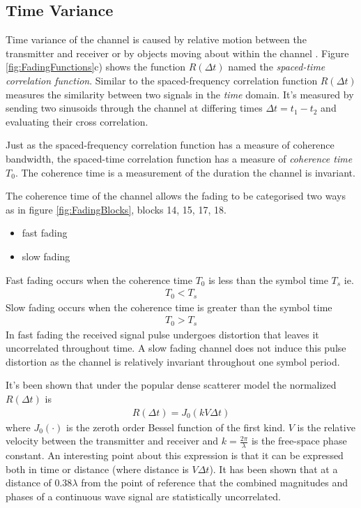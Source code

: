 \subsection{Time Variance}
Time variance of the channel is caused by relative %
motion between the transmitter and receiver or by %
objects moving about within the channel \cite{Sklar01}. %
Figure \ref{fig:FadingFunctions}c) shows the function %
$R(\Delta t)$ named the \emph{spaced-time correlation %
function}. Similar to the spaced-frequency correlation %
function $R(\Delta t)$ measures the similarity between %
two signals in the \emph{time} domain. It's measured %
by sending two sinusoids through the channel at differing %
times $\Delta t = t_{1} - t_{2}$ and evaluating their %
cross correlation. 

Just as the spaced-frequency correlation function has a %
measure of coherence bandwidth, the spaced-time %
correlation function has a measure of \emph{coherence %
time} $T_{0}$. The coherence time is a measurement of %
the duration the channel is invariant. 

The coherence time of the channel allows the fading %
to be categorised two ways as in figure \ref{fig:FadingBlocks}, %
blocks 14, 15, 17, 18.
\begin{itemize}
	\item{fast fading}
	\item{slow fading}
\end{itemize}
Fast fading occurs when the coherence time $T_{0}$ %
is less than the symbol time $T_{s}$ ie.
\begin{align}
	T_{0} < T_{s}
\end{align}
Slow fading occurs when the coherence time is %
greater than the symbol time
\begin{align}
	T_{0} > T_{s}
\end{align}
In fast fading the received signal pulse undergoes %
distortion that leaves it uncorrelated throughout time. %
A slow fading channel does not induce this pulse distortion %
as the channel is relatively invariant throughout one symbol %
period.

It's been shown \cite{Clarke68} that under the popular %
dense scatterer model the normalized $R(\Delta t)$ is
\begin{align}
	R(\Delta t) = J_{0}(kV \Delta t)
\end{align}
where $J_{0}(\cdot)$ is the zeroth order Bessel %
function of the first kind. $V$ is the relative velocity %
between the transmitter and receiver and %
$k = \frac{2\pi}{\lambda}$ is the free-space %
phase constant. An interesting point about %
this expression is that it can be expressed both %
in time or distance (where distance is $V\Delta t$). %
It has been shown \cite{Amoroso96} that at a %
distance of $0.38\lambda$ from the point of %
reference that the combined magnitudes and %
phases of a continuous wave signal are %
statistically uncorrelated.

